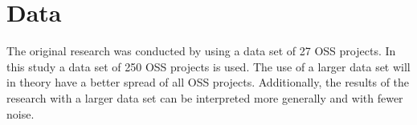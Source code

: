 \section{Data}
The original research was conducted by using a data set of 27 OSS projects. In
this study a data set of 250 OSS projects is used. The use of a larger data set
will in theory have a better spread of all OSS projects. Additionally, the
results of the research with a larger data set can be interpreted more
generally and with fewer noise.

\begin{comment}
In the original study by Karus it is shown that wavelet analysis can be used to
automatically identify evolutionary events in software development
\cite{karus2013}. He had found that by applying wavelet transformation on time
series, patterns can be found. Amongst different projects, similar patterns were
found. This indicates that these similar patterns could be the result of similar
events in the evolution of these projects.
\end{comment}

\begin{comment}
This section describes the methods used to answer the research questions. A
good structure of this section often follows the sub questions by providing a
method for each.
The research method can be based on the “Scientific method”, but more creative
solutions could be defined as well. In any case, the method needs a thorough
motivation grounded in theory in order to be acceptable.
As part of the method a number of hypotheses are described. These hypotheses
will be tested by the research, using the methods described here.
An important part of this section is validation. How will you evaluate and
validate the outcomes of the research? You can look at Paul Klint’s homepage
for examples of this section as
well\footnote{http://homepages.cwi.nl/~paulk/thesesMasterSoftwareEngineering/2006/RichardKettelerij.pdf}.
\end{comment}
